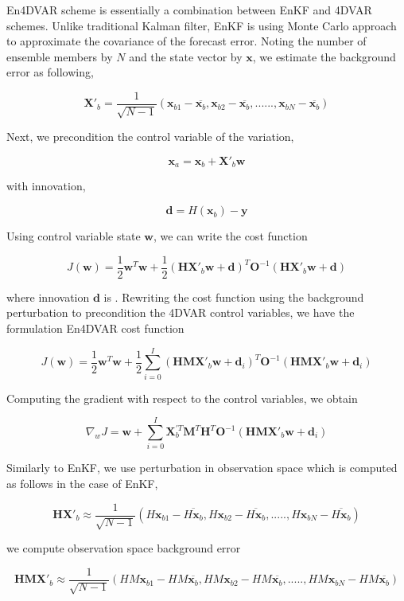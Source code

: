 \documentclass[a4,12pt]{article}
\numberwithin{equation}{section}
\begin{document}
En4DVAR scheme is essentially a combination between EnKF and 4DVAR schemes. Unlike traditional Kalman filter, EnKF is using Monte Carlo approach to approximate the covariance of the forecast error. Noting the number of ensemble members by $N$ and the state vector by $\textbf{x}$, we estimate the background error as following,

$$\textbf{X}'_{b}=\frac{1}{\sqrt{N-1}}(\textbf{x}_{b1}-\overline{\textbf{x}_{b}},\textbf{x}_{b2}-\overline{\textbf{x}_{b}},......,\textbf{x}_{bN}-\overline{\textbf{x}_{b}})$$

Next, we precondition the control variable of the variation,

$$\textbf{x}_{a} = \textbf{x}_{b} + \textbf{X}'_{b}\textbf{w}$$

with innovation,

$$\textbf{d} = H(\textbf{x}_{b})-\textbf{y}$$

Using control variable state $\textbf{w}$, we can write the cost function

$$J(\textbf{w}) = \frac{1}{2} \textbf{w}^{T}\textbf{w} + \frac{1}{2}(\textbf{H}\textbf{X}'_{b}\textbf{w}+\textbf{d})^{T}\textbf{O}^{-1}(\textbf{H}\textbf{X}'_{b}\textbf{w}+\textbf{d})$$

where innovation $\textbf{d}$ is . Rewriting the cost function using the background perturbation to precondition the 4DVAR control variables, we have the formulation En4DVAR cost function

$$J(\textbf{w}) = \frac{1}{2} \textbf{w}^{T}\textbf{w} + \frac{1}{2}\sum_{i=0}^{I}(\textbf{HM}\textbf{X}'_{b}\textbf{w} + \textbf{d}_{i})^{T}\textbf{O}^{-1}(\textbf{HMX}'_{b}\textbf{w}+\textbf{d}_{i})$$

Computing the gradient with respect to the control variables, we obtain

$$\nabla_{w}J = \textbf{w} + \sum_{i=0}^{I} \textbf{X}_{b}^{'T}\textbf{M}^{T}\textbf{H}^{T}\textbf{O}^{-1}(\textbf{HMX}'_{b}\textbf{w}+\textbf{d}_{i})$$

Similarly to EnKF, we use perturbation in observation space which is computed as follows in the case of EnKF,

$$\textbf{HX}'_{b} \approx \frac{1}{\sqrt{N-1}}(H\textbf{x}_{b1}-\overline{H\textbf{x}_{b}},H\textbf{x}_{b2}-\overline{H\textbf{x}_{b}},.....,H\textbf{x}_{bN}-\overline{H\textbf{x}_{b}})$$

we compute observation space background error

$$\textbf{HMX}'_{b} \approx \frac{1}{\sqrt{N-1}}(HM\textbf{x}_{b1}-HM\overline{\textbf{x}_{b}}, HM\textbf{x}_{b2}-HM\overline{\textbf{x}_{b}},.....,HM\textbf{x}_{bN}-HM\overline{\textbf{x}_{b}} )$$
\end{document}
